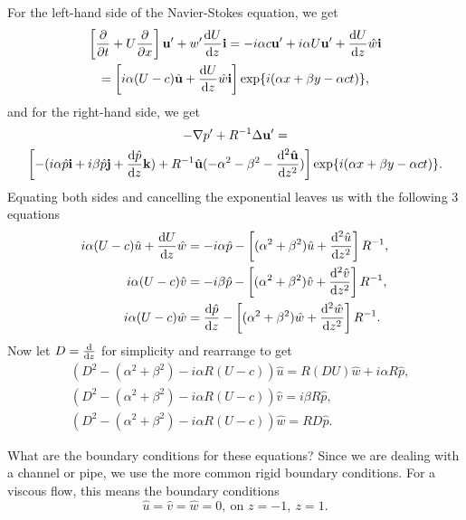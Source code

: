 For the left-hand side of the Navier-Stokes equation, we get
\begin{gather}
    \left[\pdv{}{t} + U \pdv{}{x}\right] \mathbf{u}' + w' \frac{\text{d}U}{\text{d}z} \mathbf{i} = -i \alpha c \mathbf{u}' + i \alpha U \mathbf{u}' + \frac{\text{d}U}{\text{d}z} \hat{w} \mathbf{i} \nonumber\\
    = \left[i \alpha ( U - c) \hat{\mathbf{u}} + \frac{\text{d}U}{\text{d}z} \hat{w} \mathbf{i}\right] \exp{i(\alpha x + \beta y - \alpha c t)},
\end{gather}
and for the right-hand side, we get
\begin{gather}
    -\nabla p' + R^{-1} \Delta \mathbf{u}' = \nonumber\\ \left[-(i \alpha \hat{p} \mathbf{i} + i \beta \hat{p} \mathbf{j} + \dv{\hat{p}}{z} \mathbf{k}) + R^{-1} \hat{\mathbf{u}} (- \alpha^2 - \beta^2 - \dv[2]{\hat{\mathbf{u}}}{z})\right] \exp{i(\alpha x + \beta y - \alpha c t)}.
\end{gather}
Equating both sides and cancelling the exponential leaves us with the following 3 equations
\begin{subequations}
\begin{align}
    i \alpha (U - c) \hat{u} + \dv{U}{z} \hat{w} &= -i \alpha \hat{p} - \left[(\alpha^2 + \beta^2)\hat{u} + \dv[2]{\hat{u}}{z}\right] R^{-1}, \\
    i \alpha (U - c) \hat{v} &= -i \beta \hat{p} - \left[(\alpha^2 + \beta^2)\hat{v} + \dv[2]{\hat{v}}{z}\right] R^{-1}, \\
    i \alpha (U - c) \hat{w} &= \dv{\hat{p}}{z} - \left[(\alpha^2 + \beta^2)\hat{w} + \dv[2]{\hat{w}}{z}\right] R^{-1}.
\end{align}   
\end{subequations}
Now let $ D = \dv{z} $ for simplicity and rearrange to get
\begin{subequations}
\begin{align}
    &(D^2 - (\alpha^2+\beta^2) - i \alpha R (U - c)) \hat{u} = R (DU) \hat{w} + i \alpha R \hat{p}, \label{os2}\\
    &(D^2 - (\alpha^2+\beta^2) - i \alpha R (U - c)) \hat{v} = i \beta R \hat{p}, \label{os3}\\
    &(D^2 - (\alpha^2+\beta^2) - i \alpha R (U - c)) \hat{w} = R D \hat{p} \label{os4}.
\end{align} \label{oseqcomb}
\end{subequations}

What are the boundary conditions for these equations? Since we are dealing with a channel or pipe, we use the more common rigid boundary conditions. For a viscous flow, this means the boundary conditions \citep{drazin2004hydrodynamic}
\begin{equation}
    \hat{u} = \hat{v} = \hat{w} = 0,\ \text{on } z = -1,\ z = 1.
    \label{viscousbc}
\end{equation}

